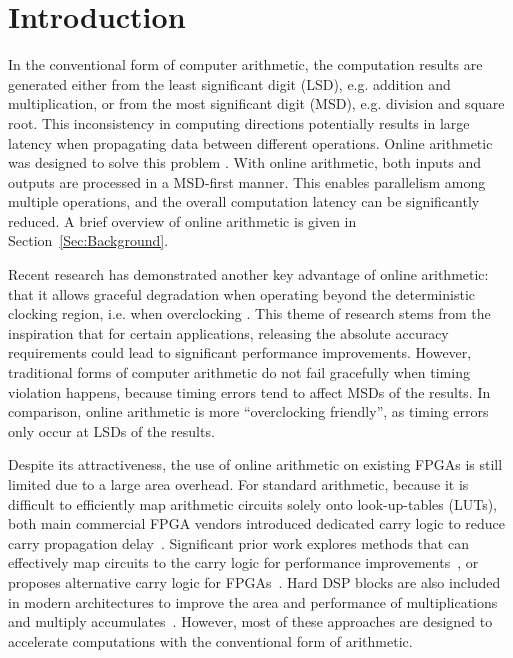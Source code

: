 \documentclass[conference]{IEEEtran}
\begin{document}
%



\section{Introduction}\label{Sec:Intro}
In the conventional form of computer arithmetic, the computation results are generated either from the least significant digit (LSD), e.g. addition and multiplication, or from the most significant digit (MSD), e.g. division and square root. This inconsistency in computing directions potentially results in large latency when propagating data between different operations. Online arithmetic was designed to solve this problem \cite{Ercegovac_OnlineOverview,Ercegovac_Book}. With online arithmetic, both inputs and outputs are processed in a MSD-first manner. This enables parallelism among multiple operations, and the overall computation latency can be significantly reduced. A brief overview of online arithmetic is given in Section~\ref{Sec:Background}.

Recent research has demonstrated another key advantage of online arithmetic: that it allows graceful degradation when operating beyond the deterministic clocking region, i.e. when overclocking \cite{SKDAC14_REVIEW}. This theme of research stems from the inspiration that for certain applications, releasing the absolute accuracy requirements could lead to significant performance improvements. However, traditional forms of computer arithmetic do not fail gracefully when timing violation happens, because timing errors tend to affect MSDs of the results. In comparison, online arithmetic is more ``overclocking friendly'', as timing errors only occur at LSDs of the results.

Despite its attractiveness, the use of online arithmetic on existing FPGAs is still limited due to a large area overhead. For standard arithmetic, because it is difficult to efficiently map arithmetic circuits solely onto look-up-tables (LUTs), both main commercial FPGA vendors introduced dedicated carry logic to reduce carry propagation delay~\cite{Virtex6}. Significant prior work explores methods that can effectively map circuits to the carry logic for performance improvements~\cite{FPL10_FPGA_CarryChain}, or proposes alternative carry logic for FPGAs~\cite{FPGA_CarryChain_New1,FPGA_CarryChain_New2}. Hard DSP blocks are also included in modern architectures to improve the area and performance of multiplications and multiply accumulates~\cite{XilinxDSP}. However, most of these approaches are designed to accelerate computations with the conventional form of arithmetic.
\end{document}
